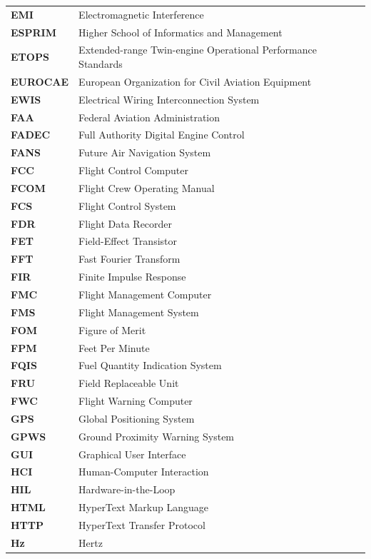 \begin{longtable}{p{3cm}p{11cm}}
\textbf{EMI} & Electromagnetic Interference \\
\textbf{ESPRIM} & Higher School of Informatics and Management \\
\textbf{ETOPS} & Extended-range Twin-engine Operational Performance Standards \\
\textbf{EUROCAE} & European Organization for Civil Aviation Equipment \\
\textbf{EWIS} & Electrical Wiring Interconnection System \\
\textbf{FAA} & Federal Aviation Administration \\
\textbf{FADEC} & Full Authority Digital Engine Control \\
\textbf{FANS} & Future Air Navigation System \\
\textbf{FCC} & Flight Control Computer \\
\textbf{FCOM} & Flight Crew Operating Manual \\
\textbf{FCS} & Flight Control System \\
\textbf{FDR} & Flight Data Recorder \\
\textbf{FET} & Field-Effect Transistor \\
\textbf{FFT} & Fast Fourier Transform \\
\textbf{FIR} & Finite Impulse Response \\
\textbf{FMC} & Flight Management Computer \\
\textbf{FMS} & Flight Management System \\
\textbf{FOM} & Figure of Merit \\
\textbf{FPM} & Feet Per Minute \\
\textbf{FQIS} & Fuel Quantity Indication System \\
\textbf{FRU} & Field Replaceable Unit \\
\textbf{FWC} & Flight Warning Computer \\
\textbf{GPS} & Global Positioning System \\
\textbf{GPWS} & Ground Proximity Warning System \\
\textbf{GUI} & Graphical User Interface \\
\textbf{HCI} & Human-Computer Interaction \\
\textbf{HIL} & Hardware-in-the-Loop \\
\textbf{HTML} & HyperText Markup Language \\
\textbf{HTTP} & HyperText Transfer Protocol \\
\textbf{Hz} & Hertz \\

\end{longtable}
